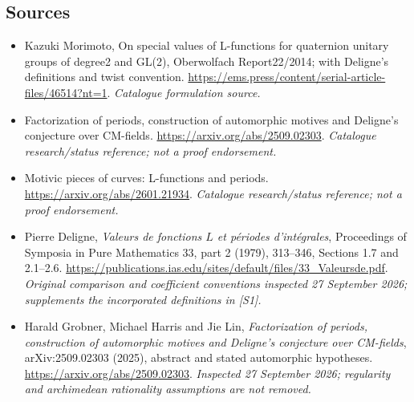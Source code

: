 \documentclass[11pt,a4paper]{article}
\numberwithin{equation}{section}
\begin{document}
\subsection{Sources}
\begin{itemize}\raggedright
\item[\textnormal{[S1]}]\hypertarget{source:71:1}{} Kazuki Morimoto, On special values of L-functions for quaternion unitary groups of degree2 and GL(2), Oberwolfach Report22/2014; with Deligne's definitions and twist convention.
\url{https://ems.press/content/serial-article-files/46514?nt=1}.
{\small\textit{Catalogue formulation source.}}
\item[\textnormal{[S2]}]\hypertarget{source:71:2}{} Factorization of periods, construction of automorphic motives and Deligne's conjecture over CM-fields.
\url{https://arxiv.org/abs/2509.02303}.
{\small\textit{Catalogue research/status reference; not a proof endorsement.}}
\item[\textnormal{[S3]}]\hypertarget{source:71:3}{} Motivic pieces of curves: L-functions and periods.
\url{https://arxiv.org/abs/2601.21934}.
{\small\textit{Catalogue research/status reference; not a proof endorsement.}}
\item[\textnormal{[E1]}]\hypertarget{extra:71:1}{} Pierre Deligne,
\emph{Valeurs de fonctions $L$ et p\'eriodes d'int\'egrales},
Proceedings of Symposia in Pure Mathematics 33, part 2 (1979), 313--346,
Sections 1.7 and 2.1--2.6.
\url{https://publications.ias.edu/sites/default/files/33_Valeursde.pdf}.
{\small\textit{Original comparison and coefficient conventions inspected
27 September 2026; supplements the incorporated definitions in [S1].}}
\item[\textnormal{[E2]}]\hypertarget{extra:71:2}{} Harald Grobner,
Michael Harris and Jie Lin, \emph{Factorization of periods, construction of
automorphic motives and Deligne's conjecture over CM-fields},
arXiv:2509.02303 (2025), abstract and stated automorphic hypotheses.
\url{https://arxiv.org/abs/2509.02303}.
{\small\textit{Inspected 27 September 2026; regularity and archimedean
rationality assumptions are not removed.}}
\end{itemize}
\end{document}
